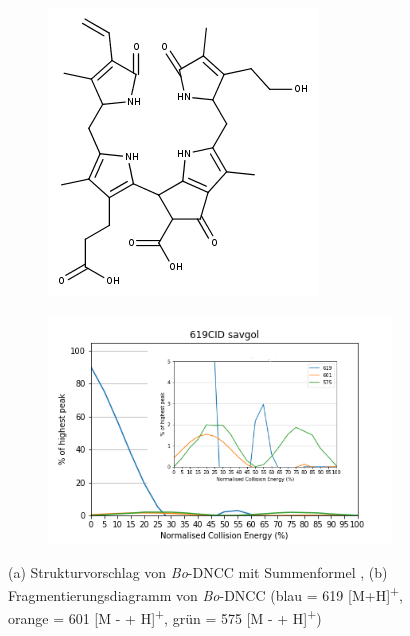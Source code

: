 \begin{figure}[!htbp]
  \begin{subfigure}[b]{0.4\textwidth}
    \includegraphics[width=\textwidth]{figures/Kapitel4/Kataboliten/fragmentation_structures/VWA_Katabolit_619.png}
    \caption{}
    \label{fig:619MKLeafspraystructure}
  \end{subfigure}
  \hfill
  \begin{subfigure}[b]{0.7\textwidth}
    \includegraphics[width=\textwidth]{figures/Kapitel4/Kataboliten/diags/619CID-savgol.png}
    \caption{}
    \label{fig:619MKLeafspraydiags}
  \end{subfigure}
  \caption[Strukturvorschlag von \textit{Bo}-DNCC mit Fragmentierungsdiagramm, Quelle: Autor]{(a) Strukturvorschlag von \textit{Bo}-DNCC mit Summenformel , (b) Fragmentierungsdiagramm von \textit{Bo}-DNCC (blau = 619 [M+H]\textsuperscript{+}, orange = 601 [M -  + H]\textsuperscript{+}, grün = 575 [M -  + H]\textsuperscript{+})}
\end{figure}

